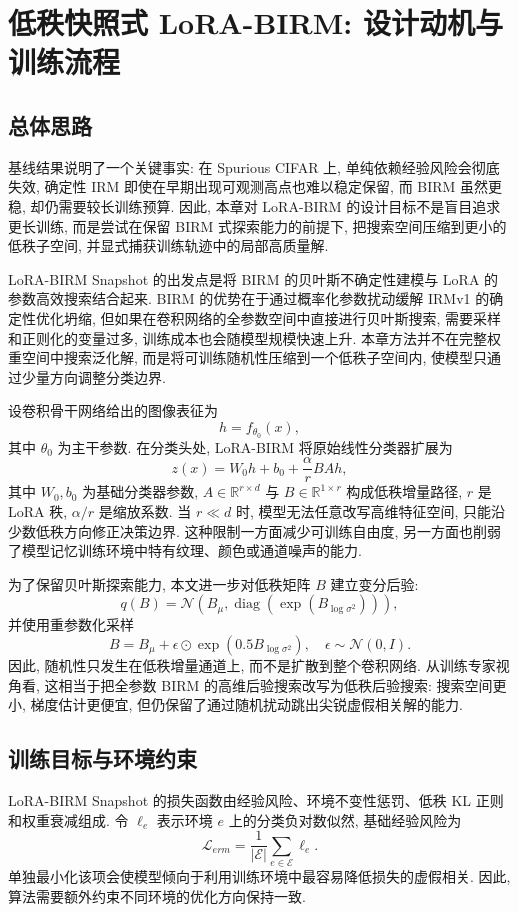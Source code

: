 \documentclass[a4paper,punct=banjiao,twoside]{ctexrep}
\theoremstyle{plain}
\theoremstyle{definition}
\theoremstyle{remark}
\begin{document}
\section{低秩快照式 LoRA-BIRM: 设计动机与训练流程}
\subsection{总体思路}

基线结果说明了一个关键事实: 在 Spurious CIFAR 上, 单纯依赖经验风险会彻底失效, 确定性 IRM 即使在早期出现可观测高点也难以稳定保留, 而 BIRM 虽然更稳, 却仍需要较长训练预算. 因此, 本章对 LoRA-BIRM 的设计目标不是盲目追求更长训练, 而是尝试在保留 BIRM 式探索能力的前提下, 把搜索空间压缩到更小的低秩子空间, 并显式捕获训练轨迹中的局部高质量解.

LoRA-BIRM Snapshot 的出发点是将 BIRM 的贝叶斯不确定性建模与 LoRA 的参数高效搜索结合起来. BIRM 的优势在于通过概率化参数扰动缓解 IRMv1 的确定性优化坍缩, 但如果在卷积网络的全参数空间中直接进行贝叶斯搜索, 需要采样和正则化的变量过多, 训练成本也会随模型规模快速上升. 本章方法并不在完整权重空间中搜索泛化解, 而是将可训练随机性压缩到一个低秩子空间内, 使模型只通过少量方向调整分类边界.

设卷积骨干网络给出的图像表征为
\[
    h=f_{\theta_0}(x),
\]
其中 $\theta_0$ 为主干参数. 在分类头处, LoRA-BIRM 将原始线性分类器扩展为
\[
    z(x)=W_0h+b_0+\frac{\alpha}{r}BAh,
\]
其中 $W_0,b_0$ 为基础分类器参数, $A\in\mathbb{R}^{r\times d}$ 与 $B\in\mathbb{R}^{1\times r}$ 构成低秩增量路径, $r$ 是 LoRA 秩, $\alpha/r$ 是缩放系数. 当 $r\ll d$ 时, 模型无法任意改写高维特征空间, 只能沿少数低秩方向修正决策边界. 这种限制一方面减少可训练自由度, 另一方面也削弱了模型记忆训练环境中特有纹理、颜色或通道噪声的能力.

为了保留贝叶斯探索能力, 本文进一步对低秩矩阵 $B$ 建立变分后验:
\[
    q(B)=\mathcal{N}\left(B_{\mu},\operatorname{diag}(\exp(B_{\log\sigma^2}))\right),
\]
并使用重参数化采样
\[
    B=B_{\mu}+\epsilon\odot\exp(0.5B_{\log\sigma^2}),\quad \epsilon\sim\mathcal{N}(0,I).
\]
因此, 随机性只发生在低秩增量通道上, 而不是扩散到整个卷积网络. 从训练专家视角看, 这相当于把全参数 BIRM 的高维后验搜索改写为低秩后验搜索: 搜索空间更小, 梯度估计更便宜, 但仍保留了通过随机扰动跳出尖锐虚假相关解的能力.

\subsection{训练目标与环境约束}

LoRA-BIRM Snapshot 的损失函数由经验风险、环境不变性惩罚、低秩 KL 正则和权重衰减组成. 令 $\ell_e$ 表示环境 $e$ 上的分类负对数似然, 基础经验风险为
\[
    \mathcal{L}_{erm}=\frac{1}{|\mathcal{E}|}\sum_{e\in\mathcal{E}}\ell_e .
\]
单独最小化该项会使模型倾向于利用训练环境中最容易降低损失的虚假相关. 因此, 算法需要额外约束不同环境的优化方向保持一致.
\end{document}
